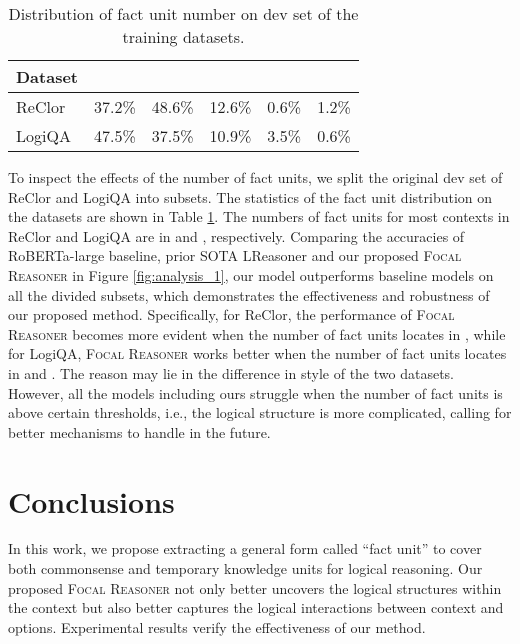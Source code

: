 \documentclass[11pt]{article}
\begin{document}
\begin{table}
\setlength{\belowcaptionskip}{5pt}
\vspace*{-2mm}
\centering\centering\setlength{\tabcolsep}{5.5pt}
\small
\begin{tabular}{lccccc}
\toprule
Dataset  &  &  &  &   &  \\ 
\midrule
ReClor&37.2\%& 48.6\%  & 12.6\% & 0.6\%  & 1.2\% \\
LogiQA & 47.5\% & 37.5\%  & 10.9\% & 3.5\%  & 0.6\%\\
\bottomrule
\end{tabular}
\caption{Distribution of fact unit number on dev set of the training datasets.} 
\label{distribution}
\vspace*{-5mm}
\end{table}

To inspect the effects of the number of fact units, we split the original dev set of ReClor and LogiQA into  subsets. The statistics of the fact unit distribution on the datasets are shown in Table \ref{distribution}. The numbers of fact units for most contexts in ReClor and LogiQA are in  and , respectively. Comparing the accuracies of RoBERTa-large baseline, prior SOTA LReasoner and our proposed \textsc{Focal Reasoner} in Figure \ref{fig:analysis_1}, our model outperforms baseline models on all the divided subsets, which demonstrates the effectiveness and robustness of our proposed method. Specifically, for ReClor, the performance of \textsc{Focal Reasoner} becomes more evident when the number of fact units locates in , while for LogiQA, \textsc{Focal Reasoner} works better when the number of fact units locates in  and . The reason may lie in the difference in style of the two datasets. However, all the models including ours struggle when the number of fact units is above certain thresholds, i.e., the logical structure is more complicated, calling for better mechanisms to handle in the future.





















\section{Conclusions}
In this work, we propose extracting a general form called ``fact unit'' to cover both commonsense and temporary knowledge units for logical reasoning. Our proposed \textsc{Focal Reasoner} not only better uncovers the logical structures within the context but also better captures the logical interactions between context and options. Experimental results verify the effectiveness of our method. 
\newpage
\end{document}
